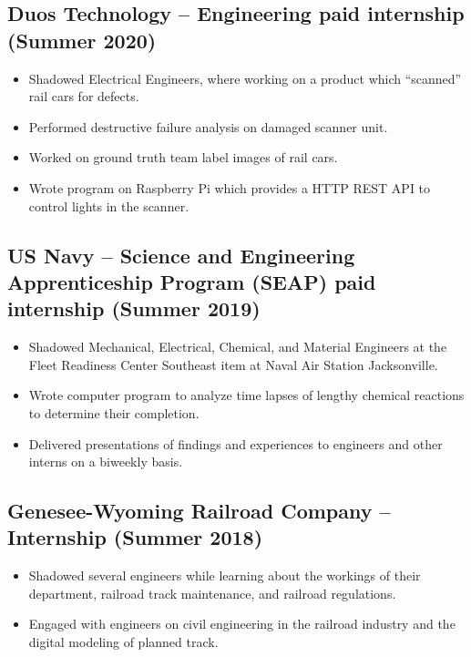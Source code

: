 \documentclass{article}
\newenvironment{CustomItemize}
{ \begin{itemize}[leftmargin=0em]
    \setlength{\itemsep}{0pt}
    \setlength{\parskip}{0pt}
    \setlength{\parindent}{0pt}
    \setlength{\parsep}{0pt}     }
{ \end{itemize}                  }
\begin{document}
\subsection{Duos Technology – Engineering paid internship (Summer 2020)}
\begin{CustomItemize}
\item Shadowed Electrical Engineers, where working on a product which ``scanned'' rail cars for defects.
\item Performed destructive failure analysis on damaged scanner unit.
\item Worked on ground truth team label images of rail cars.
\item Wrote program on Raspberry Pi which provides a HTTP REST API to control lights in the scanner.
\end{CustomItemize}

\subsection{US Navy – Science and Engineering Apprenticeship Program (SEAP) paid internship (Summer 2019)}
\begin{CustomItemize}

\item Shadowed Mechanical, Electrical, Chemical, and Material Engineers at the Fleet Readiness Center Southeast item at Naval Air Station Jacksonville.
\item Wrote computer program to analyze time lapses of lengthy chemical reactions to determine their completion.
\item Delivered presentations of findings and experiences to engineers and other interns on a biweekly basis.
\end{CustomItemize}

\subsection{Genesee-Wyoming Railroad Company – Internship (Summer 2018)}
\begin{CustomItemize}

\item Shadowed several engineers while learning about the workings of their department, railroad track maintenance, and railroad regulations.
\item Engaged with engineers on civil engineering in the railroad industry and the digital modeling of planned track.
\end{CustomItemize}
\end{document}
